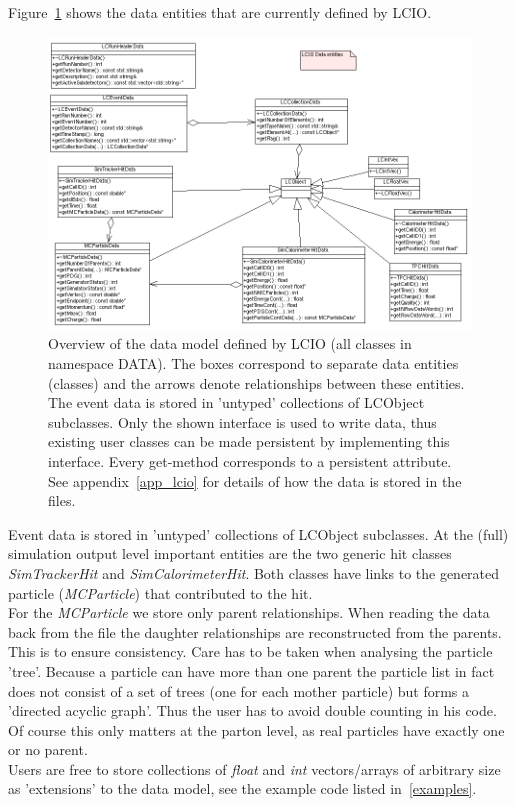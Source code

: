 \documentclass[twoside]{article}
\begin{document}
Figure~\ref{fig_datamodel} shows the data entities that are currently defined by LCIO. 
\begin{figure}
\includegraphics[width=150mm]{datamodel}    
\caption{Overview of the data model defined by LCIO (all classes in namespace DATA). 
The boxes correspond to separate
data entities (classes) and the arrows denote relationships between these entities.
The event data is stored in 'untyped' collections of LCObject subclasses.
Only the shown interface is used to write data, thus existing user classes can be made persistent 
by implementing this interface.  Every get-method
corresponds to a persistent attribute. 
See  appendix~\ref{app_lcio} for details of how the data is stored in the files.\label{fig_datamodel}
}
\end{figure}


Event data is stored in 'untyped' collections of LCObject subclasses. At the (full) simulation
output level important entities are the two generic hit classes {\em SimTrackerHit} and 
{\em SimCalorimeterHit}. Both classes have links to the generated particle ({\em MCParticle}) that 
contributed to the hit. \\
For the {\em MCParticle} we store only parent relationships. When reading the data back from the 
file the daughter relationships are reconstructed from the parents. This is to ensure consistency.
Care has to be taken when analysing the particle 'tree'. Because a particle can have more than one 
parent the particle list in fact does not consist of a set of trees (one for each mother particle) 
but  forms a 'directed acyclic graph'. Thus the user has to avoid double counting in his code.
Of course this only matters at the parton level, as real 
particles have exactly one or no parent. \\
Users are free to store collections of {\em float} and {\em int} vectors/arrays of arbitrary size
as 'extensions' to the data model, see the example code listed in~\ref{examples}.
\end{document}
